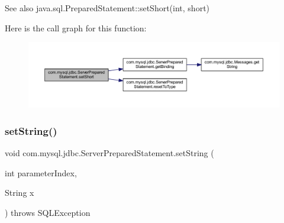 \begin{DoxySeeAlso}{See also}
java.\+sql.\+Prepared\+Statement\+::set\+Short(int, short) 
\end{DoxySeeAlso}
Here is the call graph for this function\+:
\nopagebreak
\begin{figure}[H]
\begin{center}
\leavevmode
\includegraphics[width=350pt]{classcom_1_1mysql_1_1jdbc_1_1_server_prepared_statement_ae6a2fa994a7c41fb1b5afa5826e1e447_cgraph}
\end{center}
\end{figure}
\mbox{\label{classcom_1_1mysql_1_1jdbc_1_1_server_prepared_statement_ab4b57b9dce4d775c23a01c462bc86b18}} 
\subsubsection{\texorpdfstring{set\+String()}{setString()}}
{\footnotesize\ttfamily void com.\+mysql.\+jdbc.\+Server\+Prepared\+Statement.\+set\+String (\begin{DoxyParamCaption}\item[{int}]{parameter\+Index,  }\item[{String}]{x }\end{DoxyParamCaption}) throws S\+Q\+L\+Exception}

